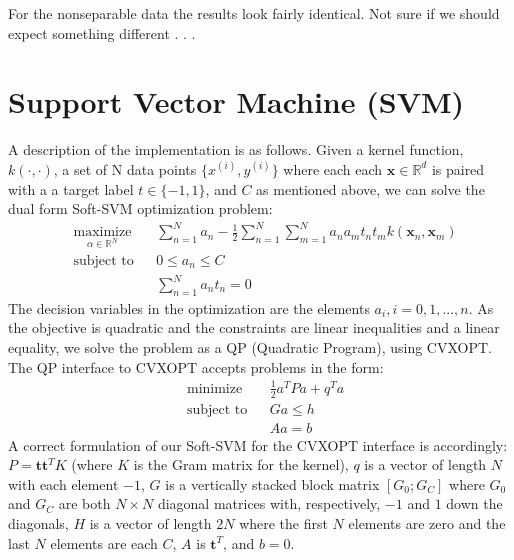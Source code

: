 \documentclass[10pt]{article}
\begin{document}
For the nonseparable data the results look fairly identical. Not sure if we should expect something different . . . 


\section{Support Vector Machine (SVM)}


A description of the implementation is as follows.  Given a kernel function, $k(\cdot,\cdot)$, a set of N data points $\{x^{(i)}, y^{(i)}\}$ where each each $\mathbf{x} \in \mathbb{R}^d$ is paired with a a target label $t \in \{-1,1\}$, and $C$ as mentioned above, we can solve the dual form Soft-SVM optimization problem:
%
\begin{equation}
\begin{aligned}
& \underset{\alpha \in \mathbb{R}^N}{\text{maximize}} && \sum_{n=1}^N a_n - \frac{1}{2} \sum_{n=1}^N \sum_{m=1}^N a_na_mt_nt_mk(\mathbf{x}_n, \mathbf{x}_m)\\
& \text{subject to}
&& 0 \le a_n \le C \\
&&&\sum_{n=1}^N a_nt_n = 0
\end{aligned}
\end{equation}
%
The decision variables in the optimization are the elements $a_i, i =0,1,...,n$.  As the objective is quadratic and the constraints are linear inequalities and a linear equality, we solve the problem as a QP (Quadratic Program), using CVXOPT.  The QP interface to CVXOPT accepts problems in the form:
\begin{equation}
\begin{aligned}
& \text{minimize} && \frac{1}{2}a^TPa + q^Ta\\
& \text{subject to}
&& Ga \le h \\
&&& Aa = b
\end{aligned}
\end{equation}
A correct formulation of our Soft-SVM for the CVXOPT interface is accordingly: $P = \mathbf{t}\mathbf{t}^T K$ (where $K$ is the Gram matrix for the kernel), $q$ is a vector of length $N$ with each element $-1$, $G$ is a vertically stacked block matrix $[G_0; G_C]$ where $G_0$ and $G_C$ are both $N \times N$ diagonal matrices with, respectively, $-1$ and $1$ down the diagonals,  $H$ is a vector of length $2N$ where the first $N$ elements are zero and the last $N$ elements are each $C$, $A$ is $\mathbf{t}^T$, and $b = 0$.
\end{document}
